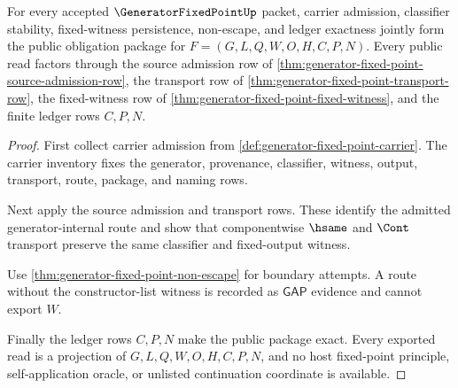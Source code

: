 \begin{theorem}
\label{thm:generator-fixed-point-public-obligation-package}
For every accepted $\GeneratorFixedPointUp$ packet, carrier admission, classifier stability, fixed-witness persistence, non-escape, and ledger exactness jointly form the public obligation package for $F=(G,L,Q,W,O,H,C,P,N)$. Every public read factors through the source admission row of \autoref{thm:generator-fixed-point-source-admission-row}, the transport row of \autoref{thm:generator-fixed-point-transport-row}, the fixed-witness row of \autoref{thm:generator-fixed-point-fixed-witness}, and the finite ledger rows $C,P,N$.
\end{theorem}
\begin{proof}
First collect carrier admission from \autoref{def:generator-fixed-point-carrier}. The carrier inventory fixes the generator, provenance, classifier, witness, output, transport, route, package, and naming rows.

Next apply the source admission and transport rows. These identify the admitted generator-internal route and show that componentwise $\hsame$ and $\Cont$ transport preserve the same classifier and fixed-output witness.

Use \autoref{thm:generator-fixed-point-non-escape} for boundary attempts. A route without the constructor-list witness is recorded as $\mathsf{GAP}$ evidence and cannot export $W$.

Finally the ledger rows $C,P,N$ make the public package exact. Every exported read is a projection of $G,L,Q,W,O,H,C,P,N$, and no host fixed-point principle, self-application oracle, or unlisted continuation coordinate is available.
\end{proof}

